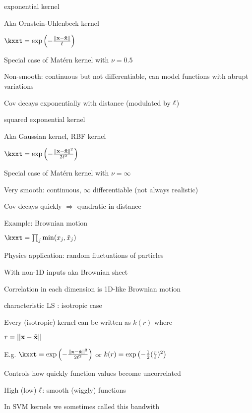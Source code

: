 \documentclass[11pt,compress,t,notes=noshow, xcolor=table]{beamer}
\begin{document}
\begin{framei}{exponential kernel}
\item Aka Ornstein-Uhlenbeck kernel
\item $\kxxt = \exp \left(-\frac{\xxtnorm}{\ls} \right)$
\item Special case of Matérn kernel with $\nu = 0.5$
\item Non-smooth: continuous but not differentiable, can model functions with abrupt variations
\item Cov decays exponentially with distance (modulated by $\ell$)
\end{framei}

\begin{framei}{squared exponential kernel}
\item Aka Gaussian kernel, RBF kernel
\item $\kxxt = \exp \left(-\frac{\xxtnorm^2}{2\ls^2} \right)$
\item Special case of Matérn kernel with $\nu = \infty$
\item Very smooth: continuous, $\infty$ differentiable (not always realistic)
\item Cov decays quickly $\Rightarrow$ quadratic in distance
\end{framei}

\begin{framei}[sep=S]{Example: Brownian motion}
\item $ \kxxt = \prod_j \min (x_j, \tilde{x}_j)$
\item Physics application: random fluctuations of particles
\item With non-1D inputs aka Brownian sheet
\item Correlation in each dimension is 1D-like Brownian motion
\vfill
{}
\end{framei}

\begin{framei}[sep=M]{characteristic LS : isotropic case}
\item Every (isotropic) kernel can be written as $k(r)$ where %
\item $r=||\mathbf{x}-\tilde{\mathbf{x}}||$
\item E.g. $\kxxt = \exp \left(-\frac{\xxtnorm^2}{2\ls^2} \right)$ or $k(r) = \exp \left(-\frac{1}{2}(\frac{r}{\ell})^2\right)$ 
\item Controls how quickly function values become uncorrelated
\item High (low) $\ell$: smooth (wiggly) functions
\vfill
{}
\item In SVM kernels we sometimes called this bandwith
\end{framei}
\end{document}
